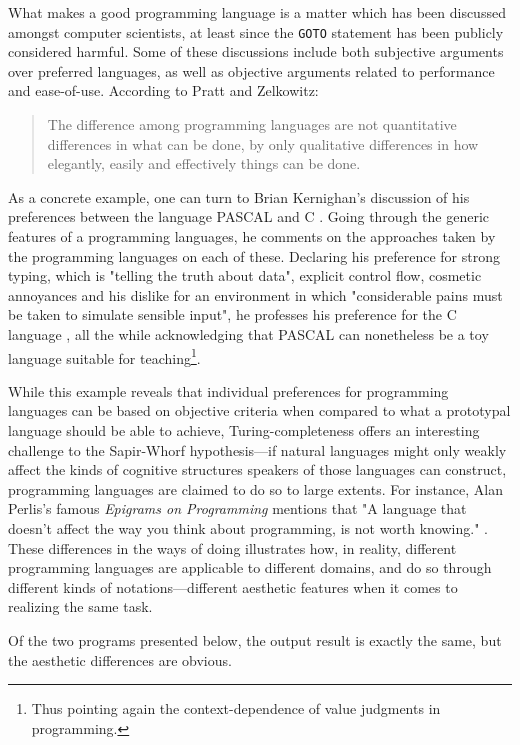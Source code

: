 What makes a good programming language is a matter which has been discussed amongst computer scientists, at least since the \lstinline{GOTO} statement has been publicly considered harmful. Some of these discussions include both subjective arguments over preferred languages, as well as objective arguments related to performance and ease-of-use. According to Pratt and Zelkowitz:

\begin{quote}
  The difference among programming languages are not quantitative differences in what can be done, by only qualitative differences in how elegantly, easily and effectively things can be done. \citep{pratt_programming_2000}
\end{quote}

As a concrete example, one can turn to Brian Kernighan's discussion of his preferences between the language PASCAL and C \citep{kernighan_why_1981}. Going through the generic features of a programming languages, he comments on the approaches taken by the programming languages on each of these. Declaring his preference for strong typing, which is "telling the truth about data", explicit control flow, cosmetic annoyances and his dislike for an environment in which "considerable pains must be taken to simulate sensible input", he professes his preference for the C language \citep{kernighan_why_1981}, all the while acknowledging that PASCAL can nonetheless be a toy language suitable for teaching\footnote{Thus pointing again the context-dependence of value judgments in programming.}.

While this example reveals that individual preferences for programming languages can be based on objective criteria when compared to what a prototypal language should be able to achieve, Turing-completeness offers an interesting challenge to the Sapir-Whorf hypothesis—if natural languages might only weakly affect the kinds of cognitive structures speakers of those languages can construct, programming languages are claimed to do so to large extents. For instance, Alan Perlis's famous \emph{Epigrams on Programming} mentions that "A language that doesn't affect the way you think about programming, is not worth knowing." \citep{perlis_special_1982}. These differences in the ways of doing illustrates how, in reality, different programming languages are applicable to different domains, and do so through different kinds of notations—different aesthetic features when it comes to realizing the same task.

Of the two programs presented below, the output result is exactly the same, but the aesthetic differences are obvious.

